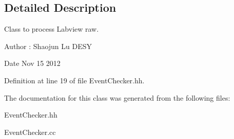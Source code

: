 \subsection{Detailed Description}
Class to process Labview raw. 

\begin{DoxyAuthor}{Author}
\-: Shaojun Lu D\-E\-S\-Y 
\end{DoxyAuthor}
\begin{DoxyDate}{Date}
Nov 15 2012 
\end{DoxyDate}


Definition at line 19 of file Event\-Checker.\-hh.



The documentation for this class was generated from the following files\-:\begin{DoxyCompactItemize}
\item 
Event\-Checker.\-hh\item 
Event\-Checker.\-cc\end{DoxyCompactItemize}
